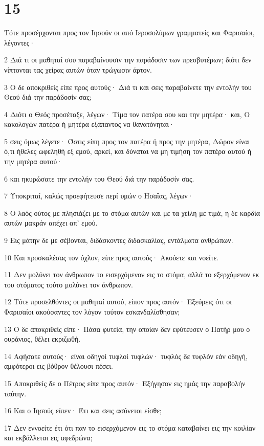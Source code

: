 \chapter{15}

\par Τότε προσέρχονται προς τον Ιησούν οι από Ιεροσολύμων γραμματείς και Φαρισαίοι, λέγοντες·
\par 2 Διά τι οι μαθηταί σου παραβαίνουσιν την παράδοσιν των πρεσβυτέρων; διότι δεν νίπτονται τας χείρας αυτών όταν τρώγωσιν άρτον.
\par 3 Ο δε αποκριθείς είπε προς αυτούς· Διά τι και σεις παραβαίνετε την εντολήν του Θεού διά την παράδοσίν σας;
\par 4 Διότι ο Θεός προσέταξε, λέγων· Τίμα τον πατέρα σου και την μητέρα· και, Ο κακολογών πατέρα ή μητέρα εξάπαντος να θανατόνηται·
\par 5 σεις όμως λέγετε· Όστις είπη προς τον πατέρα ή προς την μητέρα, Δώρον είναι ό,τι ήθελες ωφεληθή εξ εμού, αρκεί, και δύναται να μη τιμήση τον πατέρα αυτού ή την μητέρα αυτού·
\par 6 και ηκυρώσατε την εντολήν του Θεού διά την παράδοσίν σας.
\par 7 Υποκριταί, καλώς προεφήτευσε περί υμών ο Ησαΐας, λέγων·
\par 8 Ο λαός ούτος με πλησιάζει με το στόμα αυτών και με τα χείλη με τιμά, η δε καρδία αυτών μακράν απέχει απ' εμού.
\par 9 Εις μάτην δε με σέβονται, διδάσκοντες διδασκαλίας, εντάλματα ανθρώπων.
\par 10 Και προσκαλέσας τον όχλον, είπε προς αυτούς· Ακούετε και νοείτε.
\par 11 Δεν μολύνει τον άνθρωπον το εισερχόμενον εις το στόμα, αλλά το εξερχόμενον εκ του στόματος τούτο μολύνει τον άνθρωπον.
\par 12 Τότε προσελθόντες οι μαθηταί αυτού, είπον προς αυτόν· Εξεύρεις ότι οι Φαρισαίοι ακούσαντες τον λόγον τούτον εσκανδαλίσθησαν;
\par 13 Ο δε αποκριθείς είπε· Πάσα φυτεία, την οποίαν δεν εφύτευσεν ο Πατήρ μου ο ουράνιος, θέλει εκριζωθή.
\par 14 Αφήσατε αυτούς· είναι οδηγοί τυφλοί τυφλών· τυφλός δε τυφλόν εάν οδηγή, αμφότεροι εις βόθρον θέλουσι πέσει.
\par 15 Αποκριθείς δε ο Πέτρος είπε προς αυτόν· Εξήγησον εις ημάς την παραβολήν ταύτην.
\par 16 Και ο Ιησούς είπεν· Έτι και σεις ασύνετοι είσθε;
\par 17 Δεν εννοείτε έτι ότι παν το εισερχόμενον εις το στόμα καταβαίνει εις την κοιλίαν και εκβάλλεται εις αφεδρώνα;
